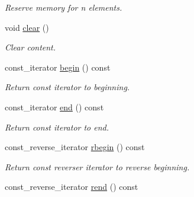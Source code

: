 \begin{DoxyCompactItemize}
\begin{DoxyCompactList}\small\item\em Reserve memory for {\itshape n} elements. \end{DoxyCompactList}\item 
void \hyperlink{classmerlin_1_1set_ae57be6d7589cfcc00a8fd582205722f9}{clear} ()\hypertarget{classmerlin_1_1set_ae57be6d7589cfcc00a8fd582205722f9}{}\label{classmerlin_1_1set_ae57be6d7589cfcc00a8fd582205722f9}

\begin{DoxyCompactList}\small\item\em Clear content. \end{DoxyCompactList}\item 
const\+\_\+iterator \hyperlink{classmerlin_1_1set_ac8f64095116304f7edee89c37771e046}{begin} () const \hypertarget{classmerlin_1_1set_ac8f64095116304f7edee89c37771e046}{}\label{classmerlin_1_1set_ac8f64095116304f7edee89c37771e046}

\begin{DoxyCompactList}\small\item\em Return const iterator to beginning. \end{DoxyCompactList}\item 
const\+\_\+iterator \hyperlink{classmerlin_1_1set_a68ae0e206fe3821db7e53d05d347551b}{end} () const \hypertarget{classmerlin_1_1set_a68ae0e206fe3821db7e53d05d347551b}{}\label{classmerlin_1_1set_a68ae0e206fe3821db7e53d05d347551b}

\begin{DoxyCompactList}\small\item\em Return const iterator to end. \end{DoxyCompactList}\item 
const\+\_\+reverse\+\_\+iterator \hyperlink{classmerlin_1_1set_aa0783ca6e1d73d3c51b051a4e3c97434}{rbegin} () const \hypertarget{classmerlin_1_1set_aa0783ca6e1d73d3c51b051a4e3c97434}{}\label{classmerlin_1_1set_aa0783ca6e1d73d3c51b051a4e3c97434}

\begin{DoxyCompactList}\small\item\em Return const reverser iterator to reverse beginning. \end{DoxyCompactList}\item 
const\+\_\+reverse\+\_\+iterator \hyperlink{classmerlin_1_1set_a2b87199b2c744d13285365c94298d238}{rend} () const \hypertarget{classmerlin_1_1set_a2b87199b2c744d13285365c94298d238}{}\label{classmerlin_1_1set_a2b87199b2c744d13285365c94298d238}


\end{DoxyCompactItemize}
